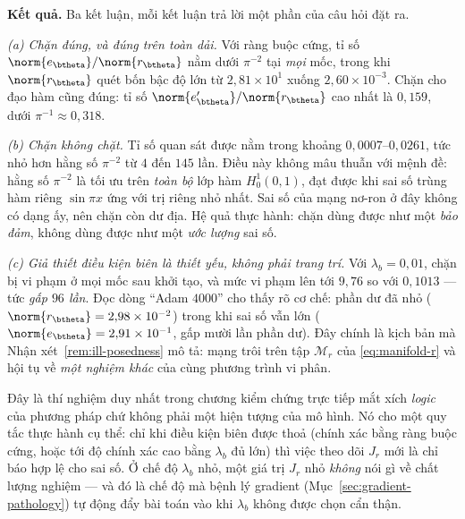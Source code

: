 \textbf{Kết quả.} Ba kết luận, mỗi kết luận trả lời một phần của câu hỏi đặt ra.

\emph{(a) Chặn đúng, và đúng trên toàn dải.} Với ràng buộc cứng, tỉ số
$\norm{e_{\btheta}}/\norm{r_{\btheta}}$ nằm dưới $\pi^{-2}$ tại \emph{mọi} mốc,
trong khi $\norm{r_{\btheta}}$ quét bốn bậc độ lớn từ $2{,}81\times10^{1}$ xuống
$2{,}60\times10^{-3}$. Chặn cho đạo hàm cũng đúng: tỉ số
$\norm{e_{\btheta}'}/\norm{r_{\btheta}}$ cao nhất là $0{,}159$, dưới
$\pi^{-1}\approx 0{,}318$.

\emph{(b) Chặn không chặt.} Tỉ số quan sát được nằm trong khoảng
$0{,}0007$--$0{,}0261$, tức nhỏ hơn hằng số $\pi^{-2}$ từ $4$ đến $145$ lần. Điều
này không mâu thuẫn với mệnh đề: hằng số $\pi^{-2}$ là tối ưu trên \emph{toàn bộ}
lớp hàm $H^1_0(0,1)$, đạt được khi sai số trùng hàm riêng $\sin \pi x$ ứng với
trị riêng nhỏ nhất. Sai số của mạng nơ-ron ở đây không có dạng ấy, nên chặn còn
dư địa. Hệ quả thực hành: chặn dùng được như một \emph{bảo đảm}, không dùng được
như một \emph{ước lượng} sai số.

\emph{(c) Giả thiết điều kiện biên là thiết yếu, không phải trang trí.} Với
$\lambda_b = 0{,}01$, chặn bị vi phạm ở mọi mốc sau khởi tạo, và mức vi phạm lên
tới $9{,}76$ so với $0{,}1013$ --- tức \emph{gấp $96$ lần}. Đọc dòng
``Adam $4000$'' cho thấy rõ cơ chế: phần dư đã nhỏ
($\norm{r_{\btheta}} = 2{,}98\times10^{-2}$) trong khi sai số vẫn lớn
($\norm{e_{\btheta}} = 2{,}91\times10^{-1}$, gấp mười lần phần dư). Đây chính là
kịch bản mà Nhận xét~\ref{rem:ill-posedness} mô tả: mạng trôi trên tập
$\mathcal{M}_r$ của \eqref{eq:manifold-r} và hội tụ về \emph{một nghiệm khác} của
cùng phương trình vi phân.

\begin{nhanxet}
\label{nx:y-nghia-tn6}
Đây là thí nghiệm duy nhất trong chương kiểm chứng trực tiếp mắt xích
\emph{logic} của phương pháp chứ không phải một hiện tượng của mô hình. Nó cho
một quy tắc thực hành cụ thể: chỉ khi điều kiện biên được thoả (chính xác bằng
ràng buộc cứng, hoặc tới độ chính xác cao bằng $\lambda_b$ đủ lớn) thì việc theo
dõi $J_r$ mới là chỉ báo hợp lệ cho sai số. Ở chế độ $\lambda_b$ nhỏ, một giá trị
$J_r$ nhỏ \emph{không} nói gì về chất lượng nghiệm --- và đó là chế độ mà bệnh lý
gradient (Mục~\ref{sec:gradient-pathology}) tự động đẩy bài toán vào khi
$\lambda_b$ không được chọn cẩn thận.
\end{nhanxet}

